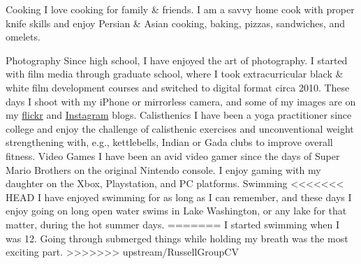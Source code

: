 



\begin{cvskills}
  \cvskill
    {Cooking} %
    {I love cooking for family \& friends. I am a savvy home cook with proper knife skills and enjoy Persian \& Asian cooking, baking, pizzas, sandwiches, and omelets.} %

  \cvskill
    {Photography} %
    {Since high school, I have enjoyed the art of photography. I started with film media through graduate school, where I took extracurricular black \& white film development courses and switched to digital format circa 2010. These days I shoot with my iPhone or mirrorless camera, and some of my images are on my \href{https://flickr.com/photos/cambysese/}{flickr} and \href{https://instagram.com/ktavabi}{Instagram} blogs.} %
  \cvskill
    {Calisthenics} %
    {I have been a yoga practitioner since college and enjoy the challenge of calisthenic exercises and unconventional weight strengthening with, e.g., kettlebells, Indian or Gada clubs to improve overall fitness.} %
  \cvskill
    {Video Games} %
    {I have been an avid video gamer since the days of Super Mario Brothers on the original Nintendo console. I enjoy gaming with my daughter on the Xbox, Playstation, and PC platforms.} %
  \cvskill
    {Swimming} %
<<<<<<< HEAD
    {I have enjoyed swimming for as long as I can remember, and these days I enjoy going on long open water swims in Lake Washington, or any lake for that matter, during the hot summer days.} %
=======
    {I started swimming when I was 12. Going through submerged things while holding my breath was the most exciting part.} %
>>>>>>> upstream/RussellGroupCV

\end{cvskills}